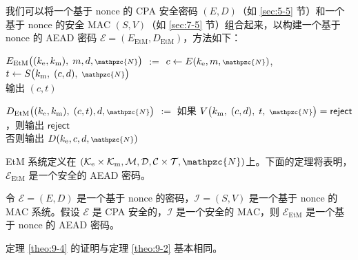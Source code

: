 \begin{snote}
我们可以将一个基于 nonce 的 CPA 安全密码 $(E,D)$（如 \ref{sec:5-5} 节）和一个基于 nonce 的安全 MAC $(S,V)$（如 \ref{sec:7-5} 节）组合起来，以构建一个基于 nonce 的 AEAD 密码 $\mathcal{E}=(E_\mathrm{EtM},D_\mathrm{EtM})$，方法如下：

\vspace*{10pt}

\hspace*{20pt} $E_\mathrm{EtM}\big((k_\mathrm{e},k_\mathrm{m}),\;m,d,{\scriptstyle\mathpzc{N}}\big)$
				\quad $:=$ \quad
				$c\leftarrow E(k_\mathrm{e},m,{\scriptstyle\mathpzc{N}})$,
				\quad
				$t\leftarrow S\big(k_\mathrm{m},\;(c,d),\;{\scriptstyle\mathpzc{N}}\big)$\\
\hspace*{187pt} 输出 $(c,t)$

\vspace*{5pt}

\hspace*{7pt} $D_\mathrm{EtM}\big((k_\mathrm{e},k_\mathrm{m}),\;(c,t),d,{\scriptstyle\mathpzc{N}}\big)$
				\quad $:=$ \quad
				如果 $V\big(k_\mathrm{m},\;(c,d),\;t,\;{\scriptstyle\mathpzc{N}}\big)=\mathsf{reject}$，则输出 $\mathsf{reject}$\\
\hspace*{187pt} 否则输出 $D(k_\mathrm{e},c,d,{\scriptstyle\mathpzc{N}})$

\vspace*{10pt}

\noindent
EtM 系统定义在 $(\mathcal{K}_\mathrm{e}\times\mathcal{K}_\mathrm{m},\mathcal{M},\mathcal{D},\mathcal{C}\times\mathcal{T},\mathpzc{N})$上。下面的定理将表明，$\mathcal{E}_\mathrm{EtM}$ 是一个安全的 AEAD 密码。
\end{snote}


\begin{theorem}\label{theo:9-4}
令 $\mathcal{E}=(E,D)$ 是一个基于 nonce 的密码，$\mathcal{I}=(S,V)$ 是一个基于 nonce 的 MAC 系统。假设 $\mathcal{E}$ 是 CPA 安全的，$\mathcal{I}$ 是一个安全的 MAC，则 $\mathcal{E}_\mathrm{EtM}$ 是一个基于 nonce 的 AEAD 密码。
\end{theorem}

定理 \ref{theo:9-4} 的证明与定理 \ref{theo:9-2} 基本相同。